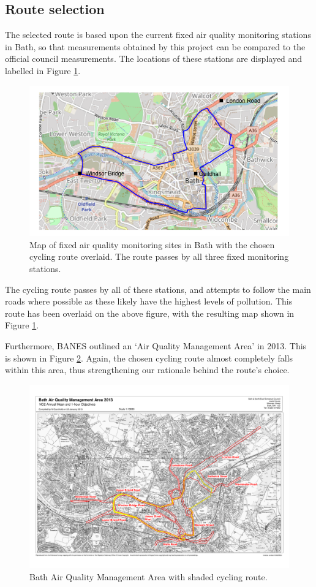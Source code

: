 \documentclass[11pt]{report}
\begin{document}
\subsection{Route selection} \label{route_selection}

The selected route is based upon the current fixed air quality monitoring stations in Bath, so that measurements obtained by this project can be compared to the official council measurements. The locations of these stations are displayed and labelled in Figure \ref{cycling_route}.

\begin{figure}[!tb]
  \centering
  \includegraphics[width=0.7\linewidth]{cycling_route}
  \caption[Cycling route.]{Map of fixed air quality monitoring sites in Bath with the chosen cycling route overlaid. The route passes by all three fixed monitoring stations.}
  \label{cycling_route}
\end{figure}

The cycling route passes by all of these stations, and attempts to follow the main roads where possible as these likely have the highest levels of pollution. This route has been overlaid on the above figure, with the resulting map shown in Figure \ref{cycling_route}.

Furthermore, BANES outlined an `Air Quality Management Area' in 2013. This is shown in Figure \ref{aqma}. Again, the chosen cycling route almost completely falls within this area, thus strengthening our rationale behind the route's choice.

\begin{figure}[!tb]
\centering
\includegraphics[width=1\textwidth]{shaded_route}
\caption[Bath Air Quality Management Area.]{Bath Air Quality Management Area \citep{BANES2017baqap} with shaded cycling route.}
\label{aqma}
\end{figure}
\end{document}
